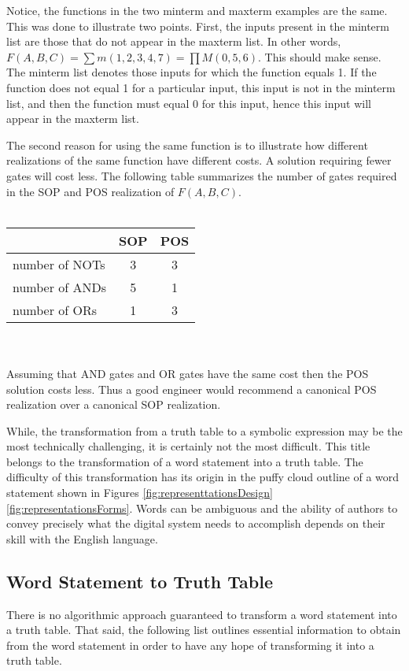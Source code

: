 Notice, the functions in the two minterm and maxterm examples are the 
same.  This was done to illustrate two points.  First, the inputs 
present in the minterm list are those that do not appear in the maxterm 
list.  In other words, $F(A,B,C) = \sum m(1,2,3,4,7) = \prod M (0,5,6)$.  
This should make sense. The minterm list denotes those inputs for 
which the function equals 1.  If the function does not equal 1 for 
a particular input, this input is not in the minterm list, and then the 
function must equal 0 for this input, hence this input will appear 
in the maxterm list.

The second reason for using the same function is to illustrate
how different realizations of the same function have different costs.
A solution requiring fewer gates
will cost less.  The following table summarizes the number of gates 
required in the SOP and POS realization of $F(A,B,C)$.
\\ \\
\begin{tabular}[ht]{l|c|c}
		    & SOP 	& POS	\\ \hline
 number of NOTs & 3	& 3	\\ \hline
 number of ANDs & 5	& 1	\\ \hline
 number of ORs  & 1	& 3	\\ 
\end{tabular}
\\ \\
Assuming that AND gates and OR gates have the same cost then the POS 
solution costs less.  Thus a good engineer would recommend a 
canonical POS realization over a canonical SOP realization.

While, the transformation from a truth table to a symbolic expression
may be the most technically challenging, it is certainly not the
most difficult.  This title belongs to the transformation of a word
statement into a truth table.  The difficulty of this transformation
has its origin in the puffy cloud outline of a word statement shown in
Figures \ref{fig:representtationsDesign} \ref{fig:representationsForms}. Words can be ambiguous and 
the ability of authors to convey precisely what the digital system
needs to accomplish depends on their skill with the English language.

\subsection{Word Statement to Truth Table}
There is no algorithmic approach guaranteed to transform a word statement 
into a truth table.  That said, the following list outlines essential
information to obtain from the word statement in order to
have any hope of transforming it into a truth table.

